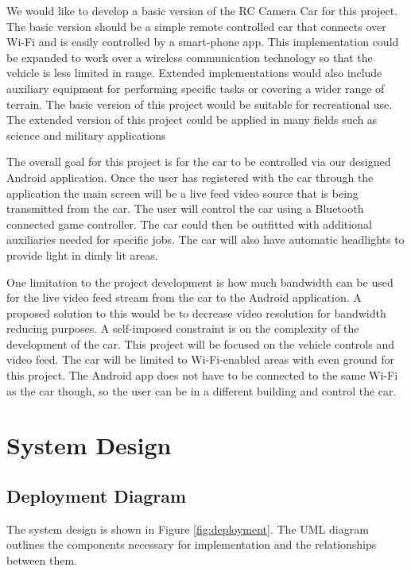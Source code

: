 \documentclass[letterpaper,12pt]{report}
\begin{document}
    We would like to develop a basic version of the RC Camera Car for this
    project. The basic version should be a simple remote controlled car that
    connects over Wi-Fi and is easily controlled by a smart-phone app. This
    implementation could be expanded to work over a wireless communication
    technology so that the vehicle is less limited in range. Extended
    implementations would also include auxiliary equipment for performing
    specific tasks or covering a wider range of terrain. The basic version
    of this project would be suitable for recreational use. The extended
    version of this project could be applied in many fields such as science
    and military applications

    The overall goal for this project is for the car to be controlled via
    our designed Android application. Once the user has registered with the
    car through the application the main screen will be a live feed video
    source that is being transmitted from the car. The user will control the
    car using a Bluetooth connected game controller. The car could then be
    outfitted with additional auxiliaries needed for specific jobs. The car
    will also have automatic headlights to provide light in dimly lit areas.

    One limitation to the project development is how much bandwidth can be
    used for the live video feed stream from the car to the Android
    application. A proposed solution to this would be to decrease video
    resolution for bandwidth reducing purposes. A self-imposed constraint is
    on the complexity of the development of the car. This project will be
    focused on the vehicle controls and video feed. The car will be limited
    to Wi-Fi-enabled areas with even ground for this project. The Android
    app does not have to be connected to the same Wi-Fi as the car though,
    so the user can be in a different building and control the car.

    \section{System Design}

    \subsection{Deployment Diagram}

    The system design is shown in Figure \ref{fig:deployment}. The UML
    diagram outlines the components necessary for implementation and the
    relationships between them.
\end{document}
